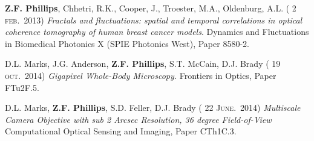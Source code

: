 \documentclass[12pt,letterpaper]{article}
\renewcommand{\date}[1]{{} #1}
\begin{document}
\textbf{Z.F. Phillips}, Chhetri, R.K., Cooper, J., Troester, M.A., Oldenburg, A.L. (\date{2 \textsc{feb.}~2013})
\emph{Fractals and  \linebreak fluctuations: spatial and temporal correlations in optical coherence tomography of human breast  \linebreak cancer models}. Dynamics and Fluctuations in Biomedical Photonics X (SPIE Photonics West), Paper 8580-2.
\medskip

D.L. Marks, J.G. Anderson, \textbf{Z.F. Phillips}, S.T. McCain, D.J. Brady (\date{19 \textsc{oct.}~2014})
\emph{Gigapixel  \linebreak Whole-Body Microscopy.} Frontiers in Optics, Paper FTu2F.5.
\medskip

D.L. Marks, \textbf{Z.F. Phillips}, S.D. Feller, D.J. Brady (\date{22 \textsc{June.}~2014})
\emph{Multiscale Camera Objective with sub 2 Arcsec Resolution, 36 degree Field-of-View} Computational Optical Sensing and Imaging,  \linebreak Paper CTh1C.3.
\medskip
\end{document}
